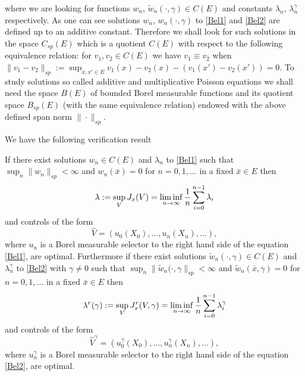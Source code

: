 \documentclass[10pt,english]{extarticle}
\begin{document}
where we are looking for functions $w_n$, $\tilde{w}_n(\cdot,\gamma)\in C(E)$ and constants $\lambda_n$, $\lambda_n^\gamma$ respectively. As one can see solutions  $w_n$, $w_n(\cdot,\gamma)$ to \eqref{Bel1} and \eqref{Bel2} are defined up to an additive constant. Therefore we shall look for such solutions in the space $C_{sp}(E)$ which is a quotient $C(E)$ with respect to the following equivalence relation: for $v_1,v_2\in C(E)$ we have $v_1\equiv v_2$ when $\|v_1-v_2\|_{sp}:=\sup_{x,x'\in E} v_1(x)-v_2(x)-(v_1(x')-v_2(x'))=0$. To study solutions so called additive and multiplicative Poisson equations we shall need the space $B(E)$ of bounded Borel measurable functions and its quotient space $B_{sp}(E)$ (with the same equivalence relation) endowed with the above defined span norm $\|\cdot\|_{sp}$.

We have the following verification result
\begin{theorem}\label{ver}
If there exist solutions $w_n\in C(E)$ and $\lambda_n$ to \eqref{Bel1} such that $\sup_n \|w_n\|_{sp}<\infty$ and $w_n(\bar{x})=0$ for $n=0,1,\ldots$ in a fixed $\bar{x}\in E$ then
\begin{equation}
\lambda:=\sup_V J_x(V)=\liminf_{n\to \infty} {1\over n} \sum_{i=0}^{n-1}\lambda_i
\end{equation}
and controls of the form
\begin{equation}\label{verst}
\hat{V}=(u_0(X_0),\ldots,u_n(X_n),\ldots),
\end{equation}
 where $u_n$ is a Borel measurable selector to the right hand side of the equation \eqref{Bel1}, are optimal.
Furthermore if there exist solutions $\tilde{w}_n(\cdot,\gamma)\in C(E)$ and $\lambda_n^\gamma$ to \eqref{Bel2} with $\gamma\neq 0$ such that $\sup_n \|\tilde{w}_n(\cdot, \gamma\|_{sp}<\infty$ and $\tilde{w}_n(\bar{x},\gamma)=0$ for $n=0,1,\ldots$ in a fixed $\bar{x}\in E$ then
\begin{equation}
\lambda^r(\gamma):=\sup_V J_x^r(V,\gamma)=\liminf_{n\to \infty} {1\over n} \sum_{i=0}^{n-1}\lambda_i^\gamma
\end{equation}
and  controls of the form 
\begin{equation}\label{verstr}
\hat{V}^\gamma=(u_0^\gamma(X_0),\ldots,u_n^\gamma(X_n),\ldots),
\end{equation}
 where $u_n^\gamma$ is a Borel measurable selector to the right hand side of the equation \eqref{Bel2}, are optimal.
\end{theorem}
\end{document}
